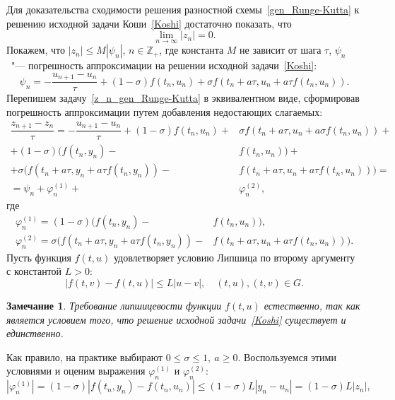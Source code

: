 \documentclass[11pt,a4paper,twoside,listtotoc,bibtotoc]{report}
\numberwithin{equation}{section}
\theoremstyle{definition}
\theoremstyle{plain}
\newtheorem*{note*}{Замечание}
\begin{document}
%
Для доказательства сходимости решения разностной схемы~\eqref{gen_Runge-Kutta}
к решению исходной задачи Коши~\eqref{Koshi} достаточно показать,
что
%
$$
    \lim\limits_{n\rightarrow\infty}|z_n| = 0.
$$
%
Покажем, что $|z_n| \leqslant M |\psi_n|$, $n\in\mathbb{Z}_+$, где константа $M$ не зависит от шага $\tau$,
$\psi_n$~"--- погрешность аппроксимации на решении исходной задачи~\eqref{Koshi}:
%
$$
    \psi_n = -\dfrac{u_{n+1} - u_n}{\tau} + (1 - \sigma)f(t_n, u_n) +
        \sigma f(t_n + a\tau, u_n + a\tau f(t_n, u_n)).
$$
%
Перепишем задачу~\eqref{z_n_gen_Runge-Kutta} в эквивалентном виде,
сформировав погрешность аппроксимации путем добавления недостающих слагаемых:
%
\begin{equation*}
%
    \begin{split}
        \dfrac{z_{n+1} - z_n}{\tau} = -\dfrac{u_{n+1} - u_n}{\tau} +
        (1-\sigma)f(t_n, u_n) +&
        \sigma f(t_n + a\tau, u_n + a\sigma f(t_n,u_n)) + \\
        + (1-\sigma)(f(t_n, y_n) -& f(t_n, u_n)) + \\
        + \sigma \big(f(t_n + a\tau, y_n + a \tau f(t_n, y_n)) -&
        f(t_n + a\tau, u_n + a\tau f(t_n, u_n))\big) = \\
        = \psi_n + \varphi_n^{(1)} +& \varphi_n^{(2)},
    \end{split}
%
\end{equation*}
%
где
%
\begin{equation*}
%
    \begin{split}
        \varphi_n^{(1)} =  (1-\sigma)(f(t_n, y_n) -& f(t_n, u_n)), \\
        \varphi_n^{(2)} =  \sigma \big(f(t_n + a\tau, y_n + a \tau f(t_n, y_n)) -&
        f(t_n + a\tau, u_n + a\tau f(t_n, u_n))\big).
    \end{split}
%
\end{equation*}
%
Пусть функция $f(t, u)$ удовлетворяет условию Липшица по второму аргументу
с константой $L>0$:
%
$$
    |f(t,v) - f(t,u)| \leqslant L|u-v|, \quad (t, u), (t, v)\in G.
$$
%
\begin{note*}
%
    Требование липшицевости функции $f(t, u)$ естественно, так
    как является условием
    того, что решение исходной задачи~\eqref{Koshi} существует и единственно.
%
\end{note*}
%
Как правило, на практике выбирают $0\leqslant\sigma\leqslant1, ~a\geqslant0$.
Воспользуемся этими условиями и оценим выражения $\varphi_n^{(1)}$ и $\varphi_n^{(2)}$:
%
$$
    |\varphi_n^{(1)}| = (1 - \sigma)|f(t_n, y_n) - f(t_n, u_n)| \leqslant
    (1 - \sigma)L|y_n - u_n| = (1 - \sigma)L|z_n|,
$$
\end{document}
